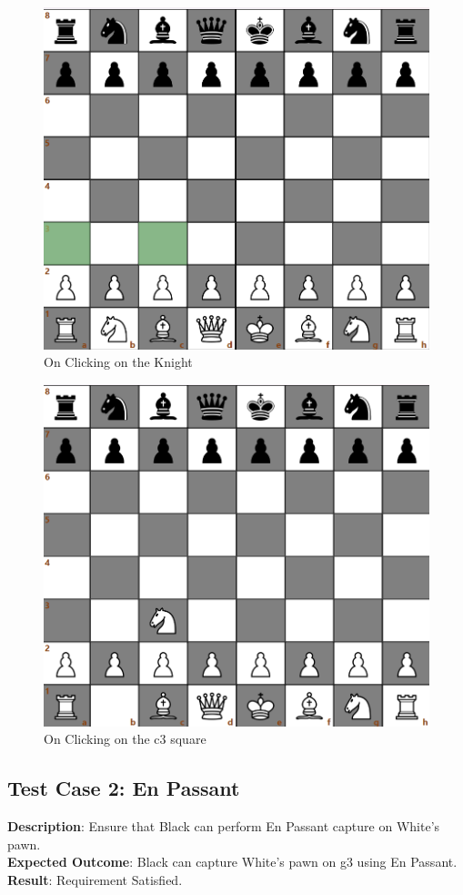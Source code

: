 \documentclass[a4paper,12pt]{article}
\begin{document}
\begin{figure}[H]
    \centering
    \includegraphics[width=0.6\linewidth]{Images/Test Cases/testCase1Img1.png}
    \caption{On Clicking on the Knight}
    \label{fig:BeforeKnightMove}
\end{figure}

\begin{figure}[H]
    \centering
    \includegraphics[width=0.6\linewidth]{Images/Test Cases/testCase1Img2.png}
    \caption{On Clicking on the c3 square}
    \label{fig:AfterKnightMove}
\end{figure}

\subsection{Test Case 2: En Passant}
\textbf{Description}: Ensure that Black can perform En Passant capture on White's pawn.\\
\textbf{Expected Outcome}: Black can capture White's pawn on g3 using En Passant.\\
\textbf{Result}: Requirement Satisfied.
\end{document}
